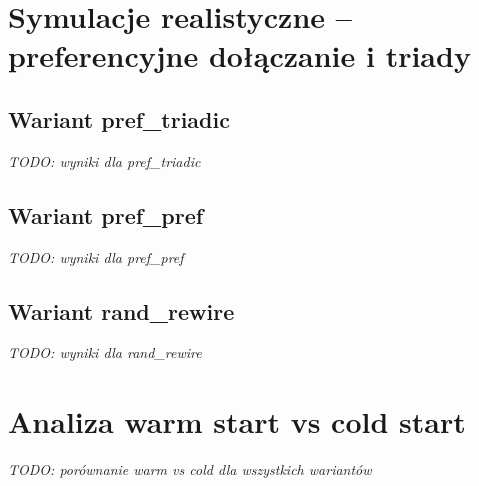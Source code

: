 \section{Symulacje realistyczne -- preferencyjne dołączanie i triady}

\subsection{Wariant pref\_triadic}

\emph{TODO: wyniki dla pref\_triadic}

\subsection{Wariant pref\_pref}

\emph{TODO: wyniki dla pref\_pref}

\subsection{Wariant rand\_rewire}

\emph{TODO: wyniki dla rand\_rewire}

\section{Analiza warm start vs cold start}

\emph{TODO: porównanie warm vs cold dla wszystkich wariantów}



